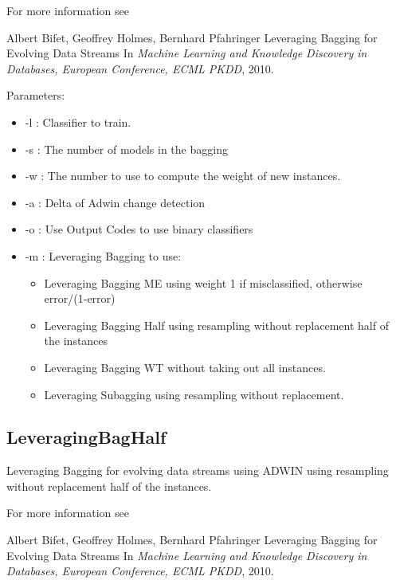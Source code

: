 \documentclass[a4paper,12pt,twoside]{book}
\begin{document}
For more information see
 
 \begin{itemize}
Albert Bifet, Geoffrey Holmes, Bernhard Pfahringer
\newblock Leveraging Bagging for Evolving Data Streams
\newblock In {\em Machine Learning and Knowledge Discovery in Databases, European
               Conference, ECML PKDD}, 2010.
\end{itemize}

Parameters:
\begin{itemize}
\item -l : Classifier to train.
\item -s : The number of models in the bagging

\item -w : The number to use to compute the weight of new instances.
\item -a : Delta of Adwin change detection
\item -o : Use Output Codes to use binary classifiers
\item -m : Leveraging Bagging to use: 
\begin{itemize}
\item Leveraging Bagging ME using weight 1 if misclassified, otherwise error/(1-error)
\item Leveraging Bagging Half using resampling without replacement half of the instances
\item Leveraging Bagging WT without taking out all instances.
\item Leveraging Subagging using resampling without replacement.
\end{itemize}
\end{itemize}

\BEGINOMIT 

\subsection{LeveragingBagHalf}
 
Leveraging Bagging for evolving data streams using ADWIN
 using resampling without replacement half of the instances.

For more information see
 
 \begin{itemize}
Albert Bifet, Geoffrey Holmes, Bernhard Pfahringer
\newblock Leveraging Bagging for Evolving Data Streams
\newblock In {\em Machine Learning and Knowledge Discovery in Databases, European
               Conference, ECML PKDD}, 2010.
\end{itemize}
\end{document}
